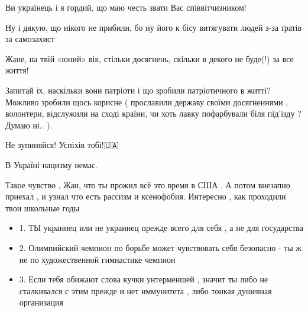 \begin{itemize}
Ви українець і я гордий, що маю честь звати Вас співвітчизником!

Ну і дякую, що нікого не прибили, бо ну його к бісу витягувати людей з-за
ґратів за самозахист\Smiley[1.0][yellow]


 

Жане, на твій «юний» вік, стільки досягнень, скільки в декого не буде(!) за все
життя!

Запитай їх, наскільки вони патріоти і що зробили патріотичного в житті? Можливо
зробили щось корисне ( прославили державу своїми досягненнями , волонтери,
відслужили на сході країни, чи хоть лавку пофарбували біля під’їзду ? Думаю
ні.. ).

Не зупиняйся! Успіхів тобі!🇺🇦


 

В Україні нацизму немає.

 

Такое чувство , Жан, что ты прожил всё это время в США . А потом внезапно
приехал , и узнал что есть рассизм и ксенофобия. Интересно , как проходили твои
школьные годы \Smiley[1.0][yellow] \Smiley[1.0][yellow] \Smiley[1.0][yellow]

\begin{itemize}
\item 1. ТЫ украинец или не украинец прежде всего для себя , а не для государства
\item 2. Олимпийский чемпион по борьбе может чувствовать себя безопасно - ты ж не по художественной гимнастике чемпион
\item 3. Если тебя обижают слова кучки унтерменшей , значит ты либо не
				сталкивался с этим прежде и нет иммунитета , либо тонкая душевная
				организация
\end{itemize}



\end{itemize}
